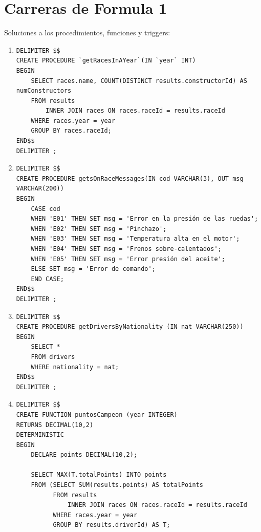 \documentclass[a4paper]{article}
\begin{document}
\section*{Carreras de Formula 1}

Soluciones a los procedimientos, funciones y triggers:

\begin{enumerate}
    \item 
    \begin{verbatim}
DELIMITER $$
CREATE PROCEDURE `getRacesInAYear`(IN `year` INT)
BEGIN
	SELECT races.name, COUNT(DISTINCT results.constructorId) AS numConstructors
    FROM results
    	INNER JOIN races ON races.raceId = results.raceId
    WHERE races.year = year
    GROUP BY races.raceId;
END$$
DELIMITER ;
    \end{verbatim}
    
    \item
    \begin{verbatim}
DELIMITER $$
CREATE PROCEDURE getsOnRaceMessages(IN cod VARCHAR(3), OUT msg VARCHAR(200))
BEGIN
	CASE cod
    WHEN 'E01' THEN SET msg = 'Error en la presión de las ruedas';
    WHEN 'E02' THEN SET msg = 'Pinchazo';
    WHEN 'E03' THEN SET msg = 'Temperatura alta en el motor';
    WHEN 'E04' THEN SET msg = 'Frenos sobre-calentados';
    WHEN 'E05' THEN SET msg = 'Error presión del aceite';
    ELSE SET msg = 'Error de comando';
    END CASE;
END$$
DELIMITER ;
    \end{verbatim}
    
    \item
    \begin{verbatim}
DELIMITER $$
CREATE PROCEDURE getDriversByNationality (IN nat VARCHAR(250))
BEGIN
    SELECT *
    FROM drivers
    WHERE nationality = nat;
END$$
DELIMITER ;
    \end{verbatim}
    
    \item
    \begin{verbatim}
DELIMITER $$
CREATE FUNCTION puntosCampeon (year INTEGER)
RETURNS DECIMAL(10,2)
DETERMINISTIC
BEGIN
	DECLARE points DECIMAL(10,2);

    SELECT MAX(T.totalPoints) INTO points
    FROM (SELECT SUM(results.points) AS totalPoints
          FROM results
              INNER JOIN races ON races.raceId = results.raceId
          WHERE races.year = year
          GROUP BY results.driverId) AS T;
          

\end{verbatim}
\end{enumerate}
\end{document}
